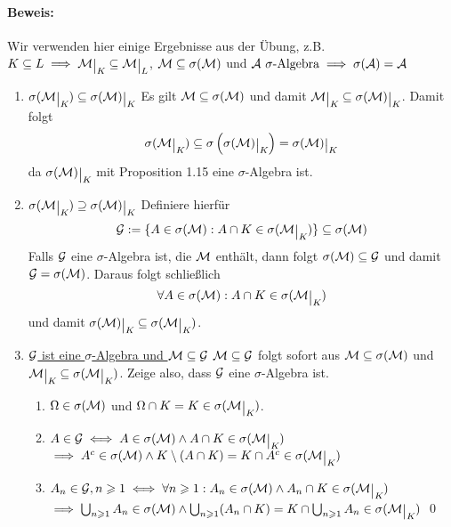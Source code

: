 \documentclass[12pt]{report}
\begin{document}
\paragraph{Beweis:}
Wir verwenden hier einige Ergebnisse aus der \"Ubung, z.B. $K\subseteq L\implies\M\krestr{K}\subseteq\M\krestr{L}$, $\mathcal{M}\subseteq\sigma(\mathcal{M})$ und $\A\ \sigma\text{-Algebra}\implies\sigma(\A)=\A$ 
\begin{enumerate}[label=\Roman*.]
    \item \underline{$\sigma(\M\krestr{K})\subseteq\sigma(\M)\krestr{K}$}\newline
    Es gilt $\mathcal{M}\subseteq\sigma(\mathcal{M})$ und damit $\M\krestr{K}\subseteq\sigma(\M)\krestr{K}$. Damit folgt
    $$\sigma(\M\krestr{K})\subseteq\sigma\left(\sigma(\M)\krestr{K}\right)=\sigma(\M)\krestr{K}$$ 
    da $\sigma(\M)\krestr{K}$ mit Proposition 1.15 eine $\sigma$-Algebra ist.
    
    \item \underline{$\sigma(\M\krestr{K})\supseteq\sigma(\M)\krestr{K}$}\newline
    Definiere hierf\"ur
    $$\G:=\{A\in\sigma(\M):A\cap K\in\sigma(\M\krestr{K})\}\subseteq\sigma(\M)$$
    Falls $\mathcal{G}$ eine $\sigma$-Algebra ist, die $\mathcal{M}$ enth\"alt, dann folgt $\sigma(\mathcal{M})\subseteq\mathcal{G}$ und damit $\mathcal{G}=\sigma(\mathcal{M})$. Daraus folgt schlie\ss{}lich
    $$\forall A\in\sigma(\M):A\cap K\in\sigma(\M\krestr{K})$$
    und damit $\sigma(\M)\krestr{K}\subseteq\sigma(\M\krestr{K})$.
    
    \item \underline{$\mathcal{G}$ ist eine $\sigma$-Algebra und $\mathcal{M}\subseteq\mathcal{G}$}\newline
    $\mathcal{M}\subseteq\mathcal{G}$ folgt sofort aus $\mathcal{M}\subseteq\sigma(\mathcal{M})$ und $\M\krestr{K}\subseteq\sigma(\M\krestr{K})$. Zeige also, dass $\mathcal{G}$ eine $\sigma$-Algebra ist.
    \begin{enumerate}[label=(\roman*)]
        \item $\Omega\in\sigma(\mathcal{M})$ und $\Omega\cap K=K\in\sigma(\M\krestr{K})$.
        \item $A\in\G\iff A\in\sigma(\M)\land A\cap K\in\sigma(\M\krestr{K})$\newline
            $\implies A^c\in\sigma(\M)\land K\setminus(A\cap K)=K\cap A^c\in\sigma(\M\krestr{K})$
        \item $A_n\in\G,n\geq1\iff \forall n\geq1:A_n\in\sigma(\M)\land A_n\cap K\in\sigma(\M\krestr{K})$\newline$\implies\bigcup_{n\geq1}A_n\in\sigma(\M)\land\bigcup_{n\geq1}(A_n\cap K)=K\cap\bigcup_{n\geq1}A_n\in\sigma(\M\krestr{K})$ \qed
    \end{enumerate}
\end{enumerate}
\end{document}
